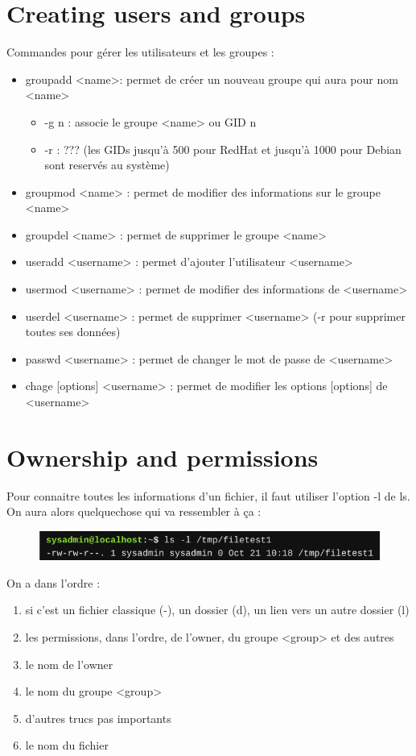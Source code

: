 \documentclass{article}
\begin{document}
\newpage
\section{Creating users and groups}
Commandes pour gérer les utilisateurs et les groupes :
\begin{itemize}
    \item groupadd <name>: permet de créer un nouveau groupe qui aura pour nom <name>
        \begin{itemize}
            \item -g n : associe le groupe <name> ou GID n
            \item -r : ??? (les GIDs jusqu'à 500 pour RedHat et jusqu'à 1000 pour Debian sont reservés au système)
        \end{itemize}
    \item groupmod <name> : permet de modifier des informations sur le groupe <name>
    \item groupdel <name> : permet de supprimer le groupe <name>
    \item useradd <username> : permet d'ajouter l'utilisateur <username>
    \item usermod <username> : permet de modifier des informations de <username>
    \item userdel <username> : permet de supprimer <username> (-r pour supprimer toutes ses données)
    \item passwd <username> : permet de changer le mot de passe de <username>
    \item chage [options] <username> : permet de modifier les options [options] de <username>
\end{itemize}

\newpage
\section{Ownership and permissions}
Pour connaitre toutes les informations d'un fichier, il faut utiliser l'option -l de ls. On aura alors quelquechose qui va ressembler à ça :
\begin{figure}
	\centering %
	\includegraphics{Images/ll_example.png}
\end{figure}
On a dans l'ordre :
\begin{enumerate}
    \item si c'est un fichier classique (-), un dossier (d), un lien vers un autre dossier (l)
    \item les permissions, dans l'ordre, de l'owner, du groupe <group> et des autres
    \item le nom de l'owner
    \item le nom du groupe <group>
    \item d'autres trucs pas importants
    \item le nom du fichier
\end{enumerate}
\end{document}
